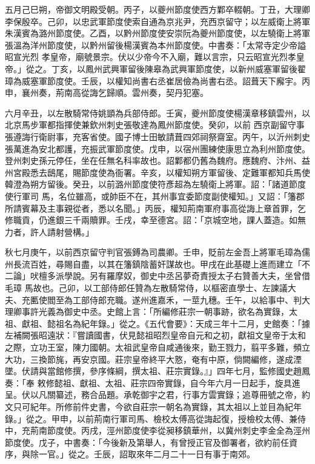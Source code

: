 \begin{pinyinscope}
 五月己巳朔，帝御文明殿受朝。丙子，以夔州節度使西方鄴卒輟朝。丁丑，大理卿李保殷卒。己卯，以忠武軍節度使索自通為京兆尹，充西京留守；以左威衛上將軍朱漢賓為潞州節度使。乙酉，以黔州節度使安崇阮為夔州節度使，以左驍衛上將軍張溫為洋州節度使，以黔州留後楊漢賓為本州節度使。中書奏：「太常寺定少帝謚昭宣光烈
 孝皇帝，廟號景宗。伏以少帝今不入廟，難以言宗，只云昭宣光烈孝皇帝。」從之。丁亥，以鳳州武興軍留後陳皋為武興軍節度使，以新州威塞軍留後翟璋為威塞軍節度使。壬辰，以權知尚書右丞崔居儉為尚書右丞。詔葺天下廨宇。丙申，襄州奏，荊南高從誨乞歸順。雲州奏，契丹犯塞。



 六月辛丑，以左散騎常侍姚顗為兵部侍郎。壬寅，夔州節度使楊漢章移鎮雲州，以北京馬步軍都指揮使兼欽州刺史張敬達為鳳州節度使。癸卯，以前
 西京副留守事張遵誨行衛尉事，充客省使。國子博士田敏請葺四郊祠祭齋室。丙午，以沂州刺史張萬進為安北都護，充振武軍節度使。戊申，以宿州團練使康思立為利州節度使。登州刺史孫元停任，坐在任無名科率故也。詔鄴都仍舊為魏府。應魏府、汴州、益州宮殿悉去鴟尾，賜節度使為衙署。辛亥，以權知朔方軍留後、定難軍都知兵馬使韓澄為朔方留後。癸丑，以前潞州節度使符彥超為左驍衛上將軍。詔：「諸道節度使行軍司
 馬，名位雖高，或帥臣不在，其州事宜委節度副使權知。」又詔：「籓郡所請賓幕及主事親從者，悉以名聞。」丙辰，權知荊南軍府事高從誨上章首罪，乞修職貢，仍進銀三千兩贖罪。壬戌，幸至德宮。詔：「京城空地，課人蓋造。如無力者，許人請射營構。」



 秋七月庚午，以前西京留守判官張鎛為司農卿。壬申，貶前左金吾上將軍毛璋為儒州長流百姓，尋賜自盡，以其在籓鎮陰蓄奸謀故也。甲戌在此基礎上進而建立「不二論」吠檀多派學說。另有羅摩奴，御史中丞呂夢奇責授太子右贊善大夫，坐曾借毛璋
 馬故也。己卯，以工部侍郎任贊為左散騎常侍，以樞密直學士、左諫議大夫、充匭使閻至為工部侍郎充職。遂州進嘉禾，一莖九穗。壬午，以給事中、判大理卿事許光義為御史中丞。史館上言：「所編修莊宗一朝事跡，欲名為實錄，太祖、獻祖、懿祖名為紀年錄。」從之。《五代會要》：天成三年十二月，史館奏：「據左補闕張昭遠狀：『嘗讀國書，伏見懿祖昭烈皇帝自元和之初，獻祖文皇帝于太和之際，立功王室，陳力國朝。太祖武皇帝自咸通後來，勤王戮力，翦平多難，頻立大功，三換節旄，再安京國。莊宗皇帝終平大憝，奄有中原，倘闕編修，遂成湮墜。伏請與當館修撰，參序條綱，撰太祖、莊宗實錄。』」四年七月，監修國史趙鳳奏：「奉
 敕修懿祖、獻祖、太祖、莊宗四帝實錄，自今年六月一日起手，旋具進呈。伏以凡關纂述，務合品題。承乾御宇之君，行事方雲實錄；追尊冊號之帝，約文只可紀年。所修前件史書，今欲自莊宗一朝名為實錄，其太祖以上並目為紀年錄。」從之。甲申，以前荊南行軍司馬、檢校太傅高從誨起復，授檢校太傅、兼侍中，充荊南節度使。丙戌，涇州節度使李從昶移鎮華州，以冀州刺史李金全為涇州節度使。戊子，中書奏：「今後新及第舉人，有曾授正官及御署者，欲約前任資序，與除一官。」從之。壬辰，詔取來年二月二十一日有事于南郊。




\end{pinyinscope}

